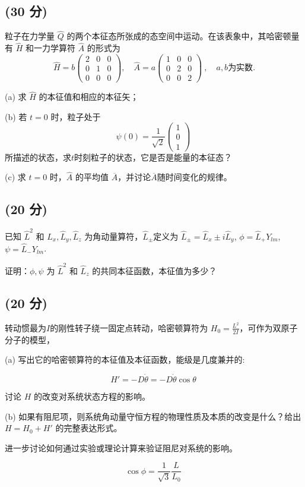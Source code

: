  \subsection{(30 分)}
 粒子在力学量 $\hat{Q}$ 的两个本征态所张成的态空间中运动。在该表象中，其哈密顿量有 $\hat{H}$ 和一力学算符 $\hat{A}$ 的形式为
$$
\hat{H} = b \begin{pmatrix}
2 & 0 & 0 \\
0 & 1 & 0 \\
0 & 0 & 0 
\end{pmatrix}, \quad \hat{A} = a \begin{pmatrix}
1 & 0 & 0 \\
0 & 2 & 0 \\
0 & 0 & 2 
\end{pmatrix}~, \quad a, b \text{为实数}.
$$

(a) 求 $\hat{H}$ 的本征值和相应的本征矢；

(b) 若 $t = 0$ 时，粒子处于
$$
\psi(0) = \frac{1}{\sqrt{2}} \begin{pmatrix}
1 \\
0 \\
1
\end{pmatrix}~
$$
所描述的状态，求$t$时刻粒子的状态，它是否是能量的本征态？

(c) 求 $t = 0$ 时，$\hat{A}$ 的平均值 $\overline{A}$，并讨论$\overline{A}$随时间变化的规律。
\subsection{(20 分)}
已知 $\hat{L}^2$ 和 $\hat{L}_x, \hat{L}_y, \hat{L}_z$ 为角动量算符，$\hat{L}_\pm$定义为 $\hat{L}_\pm = \hat{L}_x \pm i\hat{L}_y$, $\phi = \hat{L}_+ Y_{lm}$, $\psi = \hat{L}_- Y_{lm}$.

证明：$\phi, \psi$ 为 $\hat{L}^2$ 和 $\hat{L}_z$ 的共同本征函数，本征值为多少？
\subsection{(20 分)}
转动惯最为$I$的刚性转子绕一固定点转动，哈密顿算符为 $H_0 = \frac{L^2}{2I}$，可作为双原子分子的模型，

(a) 写出它的哈密顿算符的本征值及本征函数，能级是几度兼并的:

$$
H' = -D \dot{\theta} = -D \dot{\theta} \cos \theta~
$$

讨论 $H$ 的改变对系统状态方程的影响。

(b) 如果有阻尼项，则系统角动量守恒方程的物理性质及本质的改变是什么？给出 $H = H_0 + H'$ 的完整表达形式。

进一步讨论如何通过实验或理论计算来验证阻尼对系统的影响。

$$\cos \phi = \frac{1}{\sqrt{3}} \frac{L}{L_0}~$$
